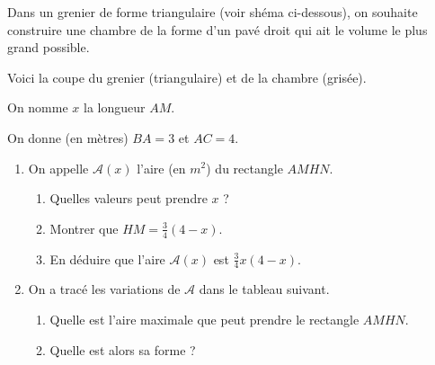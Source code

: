 \documentclass[12pt]{article}
\begin{document}
\begin{exercice}
  Dans un grenier de forme triangulaire (voir shéma ci-dessous), on souhaite construire une chambre de la forme d'un pavé droit qui ait le volume le plus grand possible.

  Voici la coupe du grenier (triangulaire) et de la chambre (grisée).

  \begin{multicols}{2}
  \begin{center}
\end{center}

On nomme $x$ la longueur $AM$.

On donne (en mètres) $BA=3$ et $AC=4$.
\end{multicols}

\begin{enumerate}
  \item On appelle $\mathcal{A}(x)$ l'aire (en $m^2$) du rectangle $AMHN$.
\begin{enumerate}
  \item Quelles valeurs peut prendre $x$ ?
  \item Montrer que $HM=\frac{3}{4}\left( 4-x \right)$.
  \item En déduire que l'aire $\mathcal{A}(x)$ est $\frac{3}{4}x\left( 4-x \right)$.
\end{enumerate}
\item On a tracé les variations de $\mathcal{A}$ dans le tableau suivant.

  \begin{center}
      \end{center}
      \begin{enumerate}
        \item Quelle est l'aire maximale que peut prendre le rectangle $AMHN$.
        \item Quelle est alors sa forme ?
      \end{enumerate}
\end{enumerate}
\end{exercice}
\end{document}
